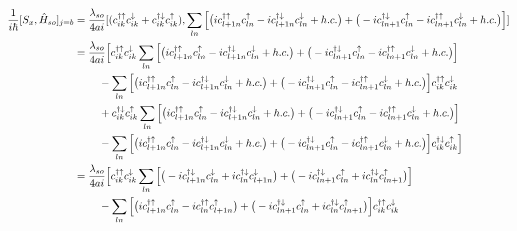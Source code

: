 \documentclass[10pt,prb,showpacs,amssymb,floatfix]{revtex4-1}
\newcommand{\dg}{\dagger}
\newcommand{\dna}{\downarrow}
\newcommand{\nn}{\nonumber}
\newcommand{\upa}{\uparrow}
\newcommand{\h}{\hat}
\begin{document}
\begin{align}
\frac{1}{i\hbar}[S_x, \h H_{so}]_{j=b} &= \frac{\lambda_{so}}{4ai} [(c_{ik}^{\dg\upa} c_{ik}^{\dna} + c_{ik}^{\dg\dna} c_{ik}^{\upa}), \sum_{ln}  \Big{[} \big{(}i c_{l+1n}^{\dagger \uparrow} c_{l n}^\uparrow  - i c_{l+1n}^{\dagger \downarrow} c_{ln}^\downarrow + h.c. \big{)} +  \big{(} -i c_{l n+1}^{\dagger \downarrow}  c_{l n}^\uparrow  - i c_{ln+1}^{\dagger \uparrow}  c_{ln}^\downarrow + h.c. \big{)}  \Big{]} ] \nn\\
&= \frac{\lambda_{so}}{4ai} \Big{[}  c_{ik}^{\dg\upa} c_{ik}^{\dna}   \sum_{ln}  \Big{[} \big{(}i c_{l+1n}^{\dagger \uparrow} c_{l n}^\uparrow  - i c_{l+1n}^{\dagger \downarrow} c_{ln}^\downarrow + h.c. \big{)} +  \big{(} -i c_{l n+1}^{\dagger \downarrow}  c_{l n}^\uparrow  - i c_{ln+1}^{\dagger \uparrow}  c_{ln}^\downarrow + h.c. \big{)}  \Big{]} \nn\\
& ~~~~~~~ - \sum_{ln}  \Big{[} \big{(}i c_{l+1n}^{\dagger \uparrow} c_{l n}^\uparrow  - i c_{l+1n}^{\dagger \downarrow} c_{ln}^\downarrow + h.c. \big{)} +  \big{(} -i c_{l n+1}^{\dagger \downarrow}  c_{l n}^\uparrow  - i c_{ln+1}^{\dagger \uparrow}  c_{ln}^\downarrow + h.c. \big{)}  \Big{]}  c_{ik}^{\dg\upa} c_{ik}^{\dna}\nn\\
& ~~~~~~~ + c_{ik}^{\dg\dna} c_{ik}^{\upa}  \sum_{ln}  \Big{[} \big{(}i c_{l+1n}^{\dagger \uparrow} c_{l n}^\uparrow  - i c_{l+1n}^{\dagger \downarrow} c_{ln}^\downarrow + h.c. \big{)} +  \big{(} -i c_{l n+1}^{\dagger \downarrow}  c_{l n}^\uparrow  - i c_{ln+1}^{\dagger \uparrow}  c_{ln}^\downarrow + h.c. \big{)}  \Big{]} \nn\\
& ~~~~~~~  - \sum_{ln}  \Big{[} \big{(}i c_{l+1n}^{\dagger \uparrow} c_{l n}^\uparrow  - i c_{l+1n}^{\dagger \downarrow} c_{ln}^\downarrow + h.c. \big{)} +  \big{(} -i c_{l n+1}^{\dagger \downarrow}  c_{l n}^\uparrow  - i c_{ln+1}^{\dagger \uparrow}  c_{ln}^\downarrow + h.c. \big{)}  \Big{]} c_{ik}^{\dg\dna} c_{ik}^{\upa}   \Big{]} \nn\\
&= \frac{\lambda_{so}}{4ai} \Big{[}  c_{ik}^{\dg\upa} c_{ik}^{\dna}   \sum_{ln}  \Big{[} \big{(}  - i c_{l+1n}^{\dagger \downarrow} c_{ln}^\downarrow + i c_{ln}^{\dagger \downarrow} c_{l+1n}^\downarrow \big{)} +  \big{(} -i c_{l n+1}^{\dagger \downarrow}  c_{l n}^\uparrow  + i c_{ln}^{\dagger \dna}  c_{ln+1}^\upa \big{)}  \Big{]} \nn\\
& ~~~~~~~ - \sum_{ln}  \Big{[} \big{(}i c_{l+1n}^{\dagger \uparrow} c_{l n}^\uparrow - i c_{l n}^{\dagger \uparrow} c_{l+1 n}^\uparrow   \big{)} +  \big{(} -i c_{l n+1}^{\dagger \downarrow}  c_{l n}^\uparrow  + i c_{ln}^{\dagger \dna}  c_{ln+1}^\upa  \big{)}  \Big{]}  c_{ik}^{\dg\upa} c_{ik}^{\dna}\nn\\

\end{align}
\end{document}
